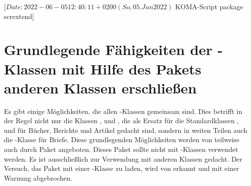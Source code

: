 %
%
%
%
%
%
%

                 [$Date: 2022-06-05 12:40:11 +0200 (So, 05. Jun 2022) $
                  KOMA-Script package scrextend]

\chapter[tocentry={Grundlegende Fähigkeiten der
  \KOMAScript-Klassen\protect\linebreak
  mit Hilfe des Pakets \Package{scrextend} anderen Klassen erschließen},
  head={Fähigkeiten von \KOMAScript-Klassen mit \Package{scrextend}}]
{Grundlegende Fähigkeiten der \KOMAScript-Klassen mit Hilfe des Pakets
   anderen Klassen erschließen}
\BeginIndexGroup
{}%

Es gibt einige Möglichkeiten, die allen \KOMAScript-Klassen gemeinsam
sind. Dies betrifft in der Regel nicht nur die Klassen ,
 und , die als Ersatz für die Standardklassen
,  und  für Bücher, Berichte und
Artikel gedacht sind, sondern in weiten Teilen auch die \KOMAScript-Klasse
 für Briefe. Diese grundlegenden Möglichkeiten werden von
\KOMAScript{} teilweise auch durch Paket 
angeboten. Dieses Paket sollte nicht mit
\KOMAScript-Klassen verwendet werden. Es ist ausschließlich zur Verwendung mit
anderen Klassen gedacht. Der Versuch, das Paket mit einer \KOMAScript-Klasse
zu laden, wird von  erkannt und mit einer Warnung
abgebrochen.

